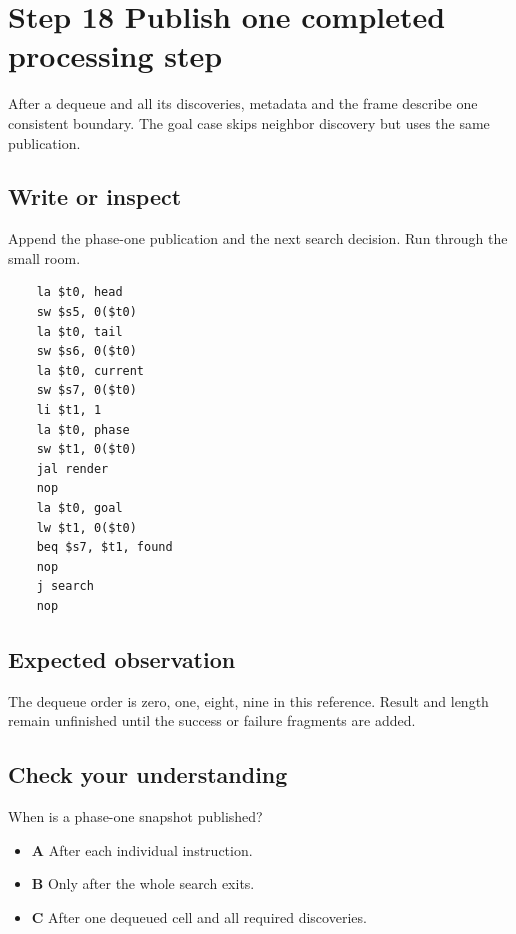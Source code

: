 \section{Step 18 Publish one completed processing step}\label{maze-s18}

After a dequeue and all its discoveries, metadata and the frame describe one consistent boundary. The goal case skips neighbor discovery but uses the same publication.

\subsection{Write or inspect}

Append the phase-one publication and the next search decision. Run through the small room.

\begin{verbatim}
    la $t0, head
    sw $s5, 0($t0)
    la $t0, tail
    sw $s6, 0($t0)
    la $t0, current
    sw $s7, 0($t0)
    li $t1, 1
    la $t0, phase
    sw $t1, 0($t0)
    jal render
    nop
    la $t0, goal
    lw $t1, 0($t0)
    beq $s7, $t1, found
    nop
    j search
    nop
\end{verbatim}

\subsection{Expected observation}

The dequeue order is zero, one, eight, nine in this reference. Result and length remain unfinished until the success or failure fragments are added.

\subsection{Check your understanding}

When is a phase-one snapshot published?

\begin{itemize}
  \item \textbf{A} After each individual instruction.
  \item \textbf{B} Only after the whole search exits.
  \item \textbf{C} After one dequeued cell and all required discoveries.
\end{itemize}
